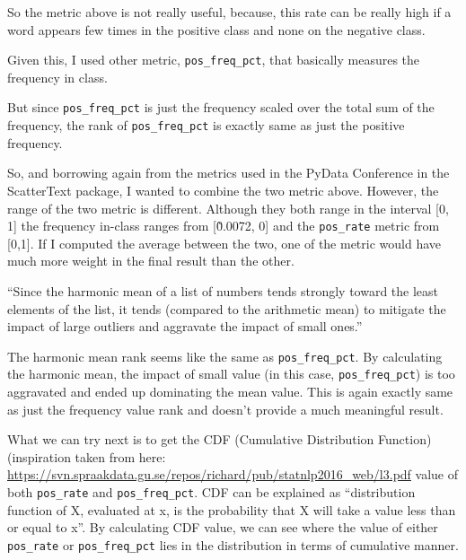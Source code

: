 \documentclass{article}
\begin{document}
So the metric above is not really useful, because, this rate can be really high if a word appears few times in the positive class and none on the negative class.

Given this, I used other metric, \texttt{pos\_freq\_pct}, that basically measures the frequency in class.

But since \texttt{pos\_freq\_pct} is just the frequency scaled over the total sum of the frequency, the rank of \texttt{pos\_freq\_pct} is exactly same as just the positive frequency.

So, and borrowing again from the metrics used in the PyData Conference in the ScatterText package, I wanted to combine the two metric above. However, the range of the two metric is different. Although they both range in the interval [0, 1] the frequency in-class ranges from [\~0.0072, 0] and the \texttt{pos\_rate} metric from [0,1]. If I computed the average between the two, one of the metric would have much more weight in the final result than the other.

“Since the harmonic mean of a list of numbers tends strongly toward the least elements of the list, it tends (compared to the arithmetic mean) to mitigate the impact of large outliers and aggravate the impact of small ones.”

The harmonic mean rank seems like the same as \texttt{pos\_freq\_pct}. By calculating the harmonic mean, the impact of small value (in this case, \texttt{pos\_freq\_pct}) is too aggravated and ended up dominating the mean value. This is again exactly same as just the frequency value rank and doesn’t provide a much meaningful result.

What we can try next is to get the CDF (Cumulative Distribution Function) (inspiration taken from here: \url{https://svn.spraakdata.gu.se/repos/richard/pub/statnlp2016_web/l3.pdf} value of both \texttt{pos\_rate} and \texttt{pos\_freq\_pct}. CDF can be explained as “distribution function of X, evaluated at x, is the probability that X will take a value less than or equal to x”. By calculating CDF value, we can see where the value of either \texttt{pos\_rate} or \texttt{pos\_freq\_pct} lies in the distribution in terms of cumulative manner.
\end{document}
